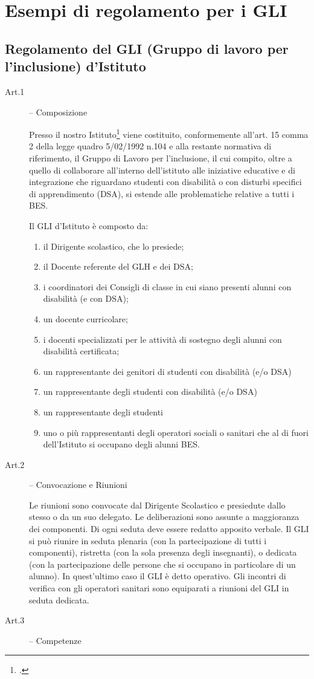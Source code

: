 \chapter{Esempi di regolamento per i GLI}
\section*{Regolamento del GLI (Gruppo di lavoro per l'inclusione) d'Istituto}
\begin{description}
	\item[Art.1] -- Composizione 
	
	Presso il nostro Istituto\footcite{IISGGasparriniMelfi2013} viene costituito, conformemente all'art. 15 comma 2 della legge quadro
	5/02/1992 n.104 e alla restante normativa di riferimento, il Gruppo di Lavoro per l'inclusione, il cui
	compito, oltre a quello di collaborare all'interno dell'istituto alle iniziative educative e di
	integrazione che riguardano studenti con disabilità o con disturbi specifici di apprendimento (DSA),
	si estende alle problematiche relative a tutti i BES.
	
	Il GLI d'Istituto è composto da:
	\begin{enumerate}
		\item  il Dirigente scolastico, che lo presiede;
		\item  il Docente referente del GLH e dei DSA;
		\item  i coordinatori dei Consigli di classe in cui siano presenti alunni con disabilità (e con DSA);
		\item un docente curricolare;
		\item  i docenti specializzati per le attività di sostegno degli alunni con disabilità certificata;
		\item un rappresentante dei genitori di studenti con disabilità (e/o DSA)
		\item un rappresentante degli studenti con disabilità (e/o DSA)
		\item  un rappresentante degli studenti
		\item uno o più rappresentanti degli operatori sociali o sanitari che al di fuori dell'Istituto si occupano
		degli alunni BES.
	\end{enumerate}
	\item [Art.2] -- Convocazione e Riunioni
	
	Le riunioni sono convocate dal Dirigente Scolastico e presiedute dallo stesso o da un suo delegato.
	Le deliberazioni sono assunte a maggioranza dei componenti.
	Di ogni seduta deve essere redatto apposito verbale.
	Il GLI si può riunire in seduta plenaria (con la partecipazione di tutti i componenti), ristretta (con
	la sola presenza degli insegnanti), o dedicata (con la partecipazione delle persone che si occupano
	in particolare di un alunno). In quest'ultimo caso il GLI è detto operativo.
	Gli incontri di verifica con gli operatori sanitari sono equiparati a riunioni del GLI in seduta
	dedicata.
	\item [Art.3] -- Competenze
	

\end{description}
